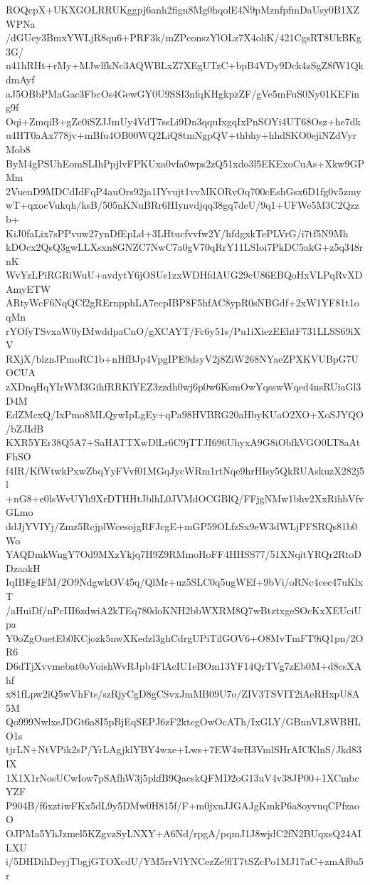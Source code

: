 ROQcpX+UKXGOLRRUKggpj6anh2fign8Mg0hqolE4N9pMznfpfmDaUsy0B1XZWPNa
/dGUey3BmxYWLjR8qu6+PRF3k/mZPconszYlOLz7X4oliK/421CgsRT8UkBKg3G/
n41hRHt+rMy+MJwlfkNc3AQWBLxZ7XEgUTzC+bpB4VDy9Dck4zSgZ8fW1QkdmAyf
aJ5OBbPMaGac3FbcOs4GewGY0U9SSI3nfqKHgkpzZF/gVe5mFuS0Ny01KEFing9f
Oqi+ZmqiB+gZc0iSZJJmUy4VdT7ssLi9Dn3qquIxgqIxPnSOYi4UT68Osz+he7dk
u4HT0aAx778jv+mBfu4OB00WQ2LiQ8tmNgpQV+thbhy+hhdSKO0ejiNZdVyrMob8
ByM4gPSUhEomSLIhPpjlvFPKUxa0vfa0wps2zQ51xdo3l5EKExoCuAs+Xkw9GPMm
2VuenD9MDCdIdFqP4auOrs92ja1IYvujt1vvMKORvOq700cEshGsx6D1fg0v5zmy
wT+qxocVukqh/ksB/505nKNuBRr6HIynvdjqq38gq7deU/9q1+UFWe5M3C2Qzzb+
KiJ0faLix7sPPvuw27ynDfEpLd+3LHtucfvvfw2Y/hfdgxkTePLVrG/i7tf5N9Mh
kDOcx2QsQ3gwLLXsxn8GNZC7NwC7a0gV70qRrY11LSIoi7PkDC5akG+z5q348rnK
WvYzLPiRGRiWuU+avdytY6jOSUs1zxWDHfdAUG29cU86EBQoHxVLPqRvXDAmyETW
ARtyWcF6NqQCf2gRErnpphLA7ecpIBP8F5hfAC8ypR0sNBGdf+2xW1YF81t1oqMn
rYOfyTSvxaW0yIMwddpaCnO/gXCAYT/Fc6y51s/Pu1iXiezEEhtF731LLSS69iXV
RXjX/blznJPmoRC1b+nHfBJp4VpgIPE9dsyV2j8ZiW268NYaeZPXKVUBpG7UOCUA
zXDnqHqYIrWM3GihfRRKlYEZ3zzdh0wj6p0w6KsmOwYqsswWqed4nsRUiaGl3D4M
EdZMcxQ/IxPmo8MLQywIpLgEy+qPa98HVBRG20aHbyKUaO2XO+XoSJYQO/bZJIdB
KXR5YEr38Q5A7+SaHATTXwDlLr6C9jTTJI696UhyxA9G8iObfkVGO0LT8aAtFhSO
f4IR/KfWtwkPxwZbqYyFVvf01MGqJycWRm1rtNqe9hrHIsy5QkRUAskuzX282j5l
+nG8+e0lsWvUYh9XrDTHHtJblhL0JVMdOCGBlQ/FFjgNMw1bhv2XxRihbVfvGLmo
ddJjYVIYj/Zmz5RcjplWcesojgRFJcgE+mGP59OLfzSx9eW3dWLjPFSRQs81b0Wo
YAQDmkWngY7Od9MXzYkjq7H9Z9RMmoHoFF4HHSS77/51XNqitYRQr2RtoDDzaakH
IqIBFg4FM/2O9NdgwkOV45q/QlMr+uz5SLC0q5ugWEf+9bVi/oRNc4cec47uKlxT
/aHuiDf/nPcIII6zdwiA2kTEq780doKNH2bbWXRM8Q7wBtztxgeSOcKxXEUciUpa
Y0oZgOuetEb0KCjozk5nwXKedzl3ghCdrgUPiTilGOV6+O8MvTmFT9iQ1pn/2OR6
D6dTjXvvmebat0oVoishWvRJpb4FlAcIU1eBOm13YF14QrTVg7zEb0M+d8csXAhf
x81fLpw2iQ5wVhFts/szRjyCgD8gCSvxJmMB09U7o/ZIV3TSVIT2iAeRHxpU8A5M
Qo999NwlxeJDGt6a8I5pBjEqSEPJ6zF2ktegOwOcATh/IxGLY/GBnnVL8WBHLO1s
tjrLN+NtVPik2sP/YrLAgjklYBY4wxe+Lws+7EW4wH3VmlSHrAICKlnS/Jkd83IX
1X1X1rNosUCwIow7pSAfhW3j5pkfB9QacskQFMD2oG13uV4v38JP00+1XCmbcYZF
P904B/f6xztiwFKx5dL9y5DMw0H815f/F+m0jxuJJGAJgKmkP6a8oyvuqCPfzaoO
OJPMa5YhJzmel5KZgvzSyLNXY+A6Nd/rpgA/pqmJ1J8wjdC2fN2BUqxsQ24AILXU
i/5DHDihDeyjTbgjGTOXcdU/YM5rrVlYNCezZe9lT7tSZcPo1MJ17aC+zmAf0u5r
